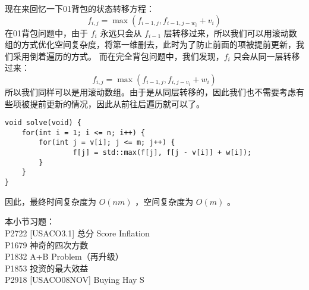 \documentclass{beamer}
\begin{document}
\begin{frame}
现在来回忆一下01背包的状态转移方程：
$$f_{i, j} = \max(f_{i - 1, j}, f_{i - 1, j - w_i} + v_i)$$
在01背包问题中，由于 $f_i$ 永远只会从 $f_{i - 1}$ 层转移过来，所以我们可以用滚动数组的方式优化空间复杂度，将第一维删去，此时为了防止前面的项被提前更新，我们采用倒着遍历的方式。
而在完全背包问题中，我们发现，$f_i$ 只会从同一层转移过来：
$$f_{i, j} = \max(f_{i - 1, j}, f_{i, j - v_i} + w_i)$$
所以我们同样可以是用滚动数组。由于是从同层转移的，因此我们也不需要考虑有些项被提前更新的情况，因此从前往后遍历就可以了。
\end{frame}
\begin{frame}[fragile]
\begin{onlyenv}
\begin{verbatim}
void solve(void) {
    for(int i = 1; i <= n; i++) {
        for(int j = v[i]; j <= m; j++) {
                f[j] = std::max(f[j], f[j - v[i]] + w[i]);
        }
    }
}
\end{verbatim}
\end{onlyenv}
因此，最终时间复杂度为 $O(nm)$ ，空间复杂度为 $O(m)$ 。
\end{frame}
\begin{frame}
本小节习题：\\ 
P2722 [USACO3.1] 总分 Score Inflation\\ 
P1679 神奇的四次方数\\ 
P1832 A+B Problem（再升级）\\ 
P1853 投资的最大效益 \\
P2918 [USACO08NOV] Buying Hay S\\
\end{frame}
\end{document}
